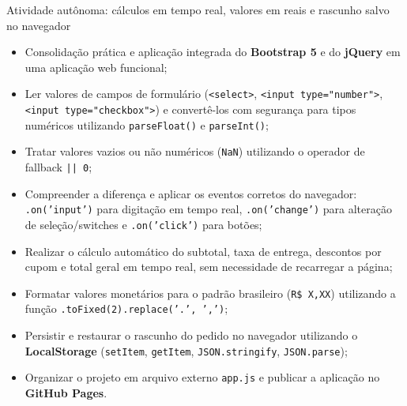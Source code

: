   {Atividade autônoma: cálculos em tempo real, valores em reais e rascunho salvo no navegador}
  {\hspace{4pt}
   \hspace{4pt}
   }

\vspace{0.4em}

\begin{boxObjetivos}
\begin{itemize}
\item Consolidação prática e aplicação integrada do \textbf{Bootstrap 5} e do \textbf{jQuery} em uma aplicação web funcional;
\item Ler valores de campos de formulário (\texttt{<select>}, \texttt{<input type="number">}, \texttt{<input type="checkbox">}) e convertê-los com segurança para tipos numéricos utilizando \texttt{parseFloat()} e \texttt{parseInt()};
\item Tratar valores vazios ou não numéricos (\texttt{NaN}) utilizando o operador de fallback \texttt{|| 0};
\item Compreender a diferença e aplicar os eventos corretos do navegador: \texttt{.on('input')} para digitação em tempo real, \texttt{.on('change')} para alteração de seleção/switches e \texttt{.on('click')} para botões;
\item Realizar o cálculo automático do subtotal, taxa de entrega, descontos por cupom e total geral em tempo real, sem necessidade de recarregar a página;
\item Formatar valores monetários para o padrão brasileiro (\texttt{R\$ X,XX}) utilizando a função \texttt{.toFixed(2).replace('.', ',')};
\item Persistir e restaurar o rascunho do pedido no navegador utilizando o \textbf{LocalStorage} (\texttt{setItem}, \texttt{getItem}, \texttt{JSON.stringify}, \texttt{JSON.parse});
\item Organizar o projeto em arquivo externo \texttt{app.js} e publicar a aplicação no \textbf{GitHub Pages}.
\end{itemize}
\end{boxObjetivos}

